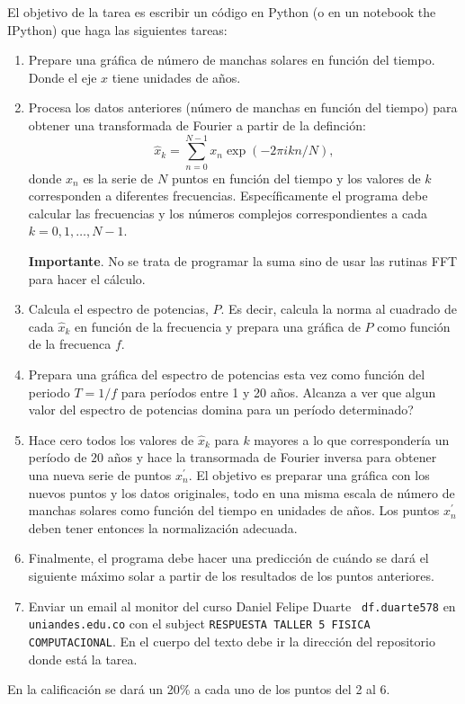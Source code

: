 \documentclass{article}
\begin{document}
El objetivo de la tarea es escribir un c\'odigo en Python (o en un
notebook the IPython) que haga las siguientes tareas:
\begin{enumerate}

\item
Prepare una gr\'afica de n\'umero de manchas solares en funci\'on del
tiempo. Donde el eje $x$ tiene unidades de a\~nos.

\item
Procesa los datos anteriores (n\'umero de manchas en funci\'on del
tiempo) para obtener una transformada de Fourier a partir de la
definci\'on:
\begin{equation}
\hat{x}_{k} = \sum_{n=0}^{N-1}x_{n}\exp(-2\pi i k n/N), 
\end{equation}
donde $x_{n}$ es la serie de $N$ puntos en funci\'on del tiempo y los
valores de $k$ corresponden a diferentes
frecuencias. Espec\'ificamente el programa debe calcular las
frecuencias y los n\'umeros complejos correspondientes a cada
$k=0,1,\dots,N-1$. 

{\bf Importante}. No se trata de programar la suma sino de usar las
rutinas FFT para hacer el c\'alculo.

\item

Calcula el espectro de potencias, $P$. Es decir, calcula la norma al
cuadrado de cada $\hat{x}_{k}$ en funci\'on de la frecuencia y prepara
una gr\'afica de $P$  como funci\'on de la frecuenca $f$. 

\item 
Prepara una gr\'afica del espectro de potencias esta vez como
funci\'on del periodo $T=1/f$  para per\'iodos entre 1 y 20
a\~nos. Alcanza a ver que algun valor del espectro de potencias domina
para un per\'iodo determinado? 

\item 
Hace cero todos los valores de $\hat{x}_{k}$ para $k$ mayores a lo que
corresponder\'ia un per\'iodo de $20$ a\~nos y hace la transormada de
Fourier inversa para obtener una nueva serie de puntos
$x^{\prime}_{n}$. El objetivo es preparar una gr\'afica con los nuevos
puntos y los datos originales, todo en una misma escala de n\'umero
de manchas solares como funci\'on del tiempo en unidades de a\~nos.
Los puntos $x^{\prime}_{n}$ deben tener entonces la normalizaci\'on
adecuada. 

\item 
Finalmente, el programa debe hacer una predicci\'on de cu\'ando se
dar\'a el siguiente m\'aximo solar a partir de los resultados de los
puntos anteriores.

\item
Enviar un email al monitor del curso Daniel Felipe Duarte {\tt
  df.duarte578} en {\tt uniandes.edu.co} con el subject
\verb"RESPUESTA TALLER 5 FISICA COMPUTACIONAL". En el cuerpo del texto
debe ir la direcci\'on del repositorio donde est\'a la tarea. 


\end{enumerate}

En la calificaci\'on se dar\'a un 20\% a cada uno de los puntos del
2 al 6.
\end{document}

